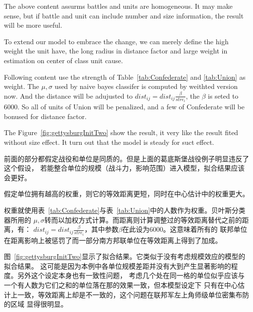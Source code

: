 \documentclass{article}
\begin{document}
The above content assurms battles and units are homogeneous. It may make sense,
but if battle and unit can include number and size information, the result will be more useful.

To extend our model to embrace the change, we can merely define the high weight the unit have,
the long radius in distance factor and large weight in estimation on center of class unit cause.

Following content use the strength of Table~\ref{tab:Confederate} and \ref{tab:Union} as weight.
The $\mu,\sigma$ used by naive bayes classifer is computed by weithted version now.
And the distance will be adujusted to $dist_{ij} = dist_{ij} \frac{\beta}{stre_i}$, the $\beta$
is seted to $6000$. So all of units of Union will be penalized, 
and a few of Confederate will be bonused for distance factor.

The Figure~\ref{fig:gettysburgInitTwo} show the result, it very like the result fited without size effect. 
It turn out that the model is steady for suct effect.

前面的部分都假定战役和单位是同质的。但是上面的葛底斯堡战役例子明显违反了这个假设，
若能整合单位的规模（战斗力，影响范围）进入模型，拟合结果应该会更好。

假定单位拥有越高的权重，则它的等效距离更短，同时在中心估计中的权重更大。

权重就使用表~\ref{tab:Confederate}与表~\ref{tab:Union}中的人数作为权重。贝叶斯分类器所用的
$\mu,\sigma$转而以加权方式计算。而距离则计算调整过的等效距离替代之前的距离，有：
$dist_{ij} = dist_{ij} \frac{\beta}{stre_i}$，其中参数$\beta$在此设为$6000$。这意味着所有的
联邦单位在距离影响上被惩罚了而一部分南方邦联单位在等效距离上得到了加成。

图~\ref{fig:gettysburgInitTwo}显示了拟合结果。它类似于没有考虑规模效应的模型的拟合结果。
这可能是因为本例中各单位规模差距并没有大到产生显著影响的程度。另外这个设定本身也有一致性问题，
考虑几个处在同一格的单位似乎应该与一个有人数为它们之和的单位落在那的效果一致，但本模型设定下
只有在中心估计上一致，等效距离上却是不一致的，这个问题在联邦军左上角师级单位密集布防的区域
显得很明显。
\end{document}
